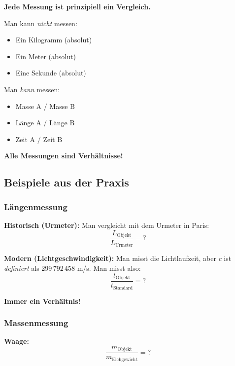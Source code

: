 \begin{theorem}
	\textbf{Jede Messung ist prinzipiell ein Vergleich.}
	
	Man kann \textit{nicht} messen:
	\begin{itemize}[nosep]
		\item Ein Kilogramm (absolut)
		\item Ein Meter (absolut)
		\item Eine Sekunde (absolut)
	\end{itemize}
	
	Man \textit{kann} messen:
	\begin{itemize}[nosep]
		\item Masse A / Masse B
		\item Länge A / Länge B
		\item Zeit A / Zeit B
	\end{itemize}
	
	\textbf{Alle Messungen sind Verhältnisse!}
\end{theorem}

\subsection{Beispiele aus der Praxis}

\subsubsection{Längenmessung}

\textbf{Historisch (Urmeter):}
Man vergleicht mit dem Urmeter in Paris:
\begin{equation}
	\frac{L_\text{Objekt}}{L_\text{Urmeter}} = ?
\end{equation}

\textbf{Modern (Lichtgeschwindigkeit):}
Man misst die Lichtlaufzeit, aber $c$ ist \textit{definiert} als 299\,792\,458 m/s. Man misst also:
\begin{equation}
	\frac{t_\text{Objekt}}{t_\text{Standard}} = ?
\end{equation}

\textbf{Immer ein Verhältnis!}

\subsubsection{Massenmessung}

\textbf{Waage:}
\begin{equation}
	\frac{m_\text{Objekt}}{m_\text{Eichgewicht}} = ?
\end{equation}

